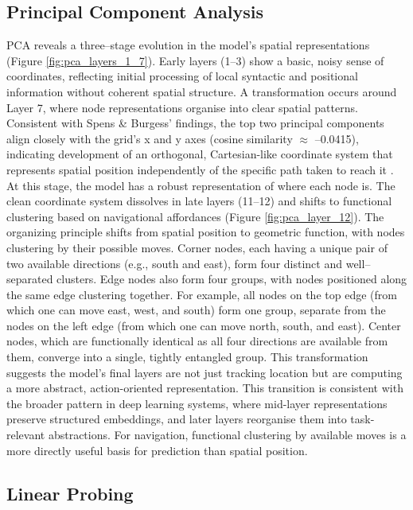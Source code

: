 \subsection{Principal Component Analysis}

PCA reveals a three--stage evolution in the model's spatial representations (Figure \ref{fig:pca_layers_1_7}). Early layers (1--3) show a basic, noisy sense of coordinates, reflecting initial processing of local syntactic and positional information without coherent spatial structure. A transformation occurs around Layer 7, where node representations organise into clear spatial patterns. Consistent with Spens \& Burgess' findings, the top two principal components align closely with the grid's x and y axes (cosine similarity $\approx$ --0.0415), indicating development of an orthogonal, Cartesian-like coordinate system that represents spatial position independently of the specific path taken to reach it \citep{Spens2024consolidation}. At this stage, the model has a robust representation of where each node is. The clean coordinate system dissolves in late layers (11--12) and shifts to functional clustering based on navigational affordances (Figure \ref{fig:pca_layer_12}). The organizing principle shifts from spatial position to geometric function, with nodes clustering by their possible moves. Corner nodes, each having a unique pair of two available directions (e.g., south and east), form four distinct and well--separated clusters. Edge nodes also form four groups, with nodes positioned along the same edge clustering together. For example, all nodes on the top edge (from which one can move east, west, and south) form one group, separate from the nodes on the left edge (from which one can move north, south, and east). Center nodes, which are functionally identical as all four directions are available from them, converge into a single, tightly entangled group. This transformation suggests the model's final layers are not just tracking location but are computing a more abstract, action-oriented representation. This transition is consistent with the broader pattern in deep learning systems, where mid-layer representations preserve structured embeddings, and later layers reorganise them into task-relevant abstractions. For navigation, functional clustering by available moves is a more directly useful basis for prediction than spatial position.

\subsection{Linear Probing}

